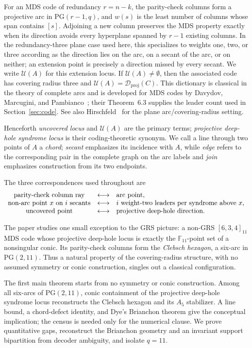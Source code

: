 \documentclass[11pt]{article}
\theoremstyle{definition}
\theoremstyle{remark}
\newcommand{\PG}{\mathrm{PG}}
\newcommand{\F}{\mathbb{F}}
\newcommand{\cU}{\mathcal{U}}
\begin{document}
For an MDS code of redundancy $r=n-k$, the parity-check columns form a
projective arc in $\PG(r-1,q)$, and $w(s)$ is the least number of columns
whose span contains $[s]$. Adjoining a new column preserves the MDS property
exactly when its direction avoids every hyperplane spanned by $r-1$ existing
columns. In the redundancy-three plane case used here, this specializes to
weights one, two, or three according as the direction lies on the arc, on a
secant of the arc, or on neither; an extension point is precisely a direction
missed by every secant. We write $\cU(A)$ for this extension locus. If
$\cU(A)\ne\emptyset$, then the associated code has covering radius three
and $\cU(A)=\mathcal D_{\mathrm{proj}}(C)$. This dictionary is classical in
the theory of complete arcs and is developed for MDS codes by Davydov,
Marcugini, and Pambianco~\cite{DMP2021}; their Theorem~6.3 supplies the
leader count used in Section~\ref{sec:code}. See also
Hirschfeld~\cite{Hirschfeld1998} for the plane arc/covering-radius setting.

Henceforth \emph{uncovered locus} and $\cU(A)$ are the primary terms;
\emph{projective deep-hole syndrome locus} is their coding-theoretic synonym.
We call a line through two points of $A$ a \emph{chord}; \emph{secant}
emphasizes its incidence with $A$, while \emph{edge} refers to the
corresponding pair in the complete graph on the arc labels and \emph{join}
emphasizes construction from its two endpoints.

The three correspondences used throughout are
\[
\begin{array}{c@{\quad\longleftrightarrow\quad}l}
\text{parity-check column ray}&\text{arc point},\\
\text{non-arc point $x$ on $i$ secants}&
  \text{$i$ weight-two leaders per syndrome above $x$},\\
\text{uncovered point}&\text{projective deep-hole direction}.
\end{array}
\]

The paper studies one small exception to the GRS picture: a non-GRS
$[6,3,4]_{11}$ MDS code whose projective deep-hole locus is exactly the
$\F_{11}$-point set of a nonsingular conic. Its parity-check columns form
the \emph{Clebsch hexagon}, a six-arc in $\PG(2,11)$. Thus a natural
property of the covering-radius structure, with no assumed symmetry or
conic construction, singles out a classical configuration.

The first main theorem starts from no symmetry or conic construction.
Among all six-arcs of $\PG(2,11)$, conic containment of the projective
deep-hole syndrome locus reconstructs the Clebsch hexagon and its $A_5$
stabilizer.  A line bound, a chord-defect identity, and Dye's Brianchon
theorem give the conceptual implication; the census is needed only for the
numerical clause.  We prove quantitative gaps, reconstruct the Brianchon
geometry and an invariant support bipartition from decoder ambiguity, and
isolate $q=11$.
\end{document}
